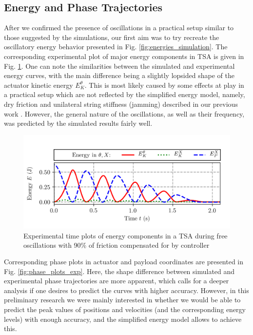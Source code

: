 \subsection{Energy and Phase Trajectories}
After we confirmed the presence of oscillations in a practical setup similar to those suggested by the simulations, our first aim was to try recreate the oscillatory energy behavior presented in Fig. \ref{fig:energies_simulation}. The corresponding experimental plot of major energy components in TSA is given in Fig. \ref{fig:energies_exp}. One can note the similarities between the simulated and experimental energy curves, with the main difference being a slightly lopsided shape of the actuator kinetic energy $E_K^\theta$. This is most likely caused by some effects at play in a practical setup which are not reflected by the simplified energy model, namely, dry friction and unilateral string stiffness (jamming) described in our previous work \cite{nedelchev2020accurate}. However, the general nature of the oscillations, as well as their frequency, was predicted by the simulated results fairly well.
\begin{figure}
		\centering
		\includegraphics[trim= 0.0cm 1.0cm 0.0cm 0.0cm,width=1.0\columnwidth]{pics/plots/exp_energy_damp.png}
		\caption{Experimental time plots of energy components in a TSA during free oscillations with 90\% of friction compensated for by controller}
 		\label{fig:energies_exp}
		\vspace*{-2mm} 
\end{figure}

Corresponding phase plots in actuator and payload coordinates are presented in Fig. \ref{fig:phase_plots_exp}. Here, the shape difference between simulated and experimental phase trajectories are more apparent, which calls for a deeper analysis if one desires to predict the curves with higher accuracy. However, in this preliminary research we were mainly interested in whether we would be able to predict the peak values of positions and velocities (and the corresponding energy levels) with enough accuracy, and the simplified energy model allows to achieve this. 

